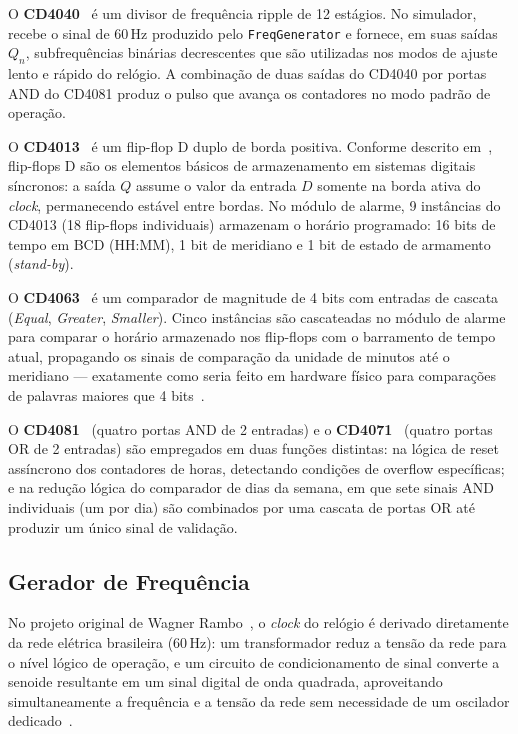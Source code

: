 \documentclass[12pt]{article}
\begin{document}
O \textbf{CD4040}~\cite{ti:cd4040} é um divisor de frequência ripple de 12 estágios. No simulador, recebe o sinal de 60\,Hz produzido pelo \texttt{FreqGenerator} e fornece, em suas saídas $Q_n$, subfrequências binárias decrescentes que são utilizadas nos modos de ajuste lento e rápido do relógio. A combinação de duas saídas do CD4040 por portas AND do CD4081 produz o pulso que avança os contadores no modo padrão de operação.

O \textbf{CD4013}~\cite{ti:cd4013} é um flip-flop D duplo de borda positiva. Conforme descrito em~\cite{floyd}, flip-flops D são os elementos básicos de armazenamento em sistemas digitais síncronos: a saída $Q$ assume o valor da entrada $D$ somente na borda ativa do \textit{clock}, permanecendo estável entre bordas. No módulo de alarme, 9 instâncias do CD4013 (18 flip-flops individuais) armazenam o horário programado: 16 bits de tempo em BCD (HH:MM), 1 bit de meridiano e 1 bit de estado de armamento (\textit{stand-by}).

O \textbf{CD4063}~\cite{ti:cd4063} é um comparador de magnitude de 4 bits com entradas de cascata (\textit{Equal}, \textit{Greater}, \textit{Smaller}). Cinco instâncias são cascateadas no módulo de alarme para comparar o horário armazenado nos flip-flops com o barramento de tempo atual, propagando os sinais de comparação da unidade de minutos até o meridiano — exatamente como seria feito em hardware físico para comparações de palavras maiores que 4 bits~\cite{tocci}.

O \textbf{CD4081}~\cite{ti:cd4081} (quatro portas AND de 2 entradas) e o \textbf{CD4071}~\cite{ti:cd4071} (quatro portas OR de 2 entradas) são empregados em duas funções distintas: na lógica de reset assíncrono dos contadores de horas, detectando condições de overflow específicas; e na redução lógica do comparador de dias da semana, em que sete sinais AND individuais (um por dia) são combinados por uma cascata de portas OR até produzir um único sinal de validação.

\subsection{Gerador de Frequência}

No projeto original de Wagner Rambo~\cite{rambo:15}, o \textit{clock} do relógio é derivado diretamente da rede elétrica brasileira (60\,Hz): um transformador reduz a tensão da rede para o nível lógico de operação, e um circuito de condicionamento de sinal converte a senoide resultante em um sinal digital de onda quadrada, aproveitando simultaneamente a frequência e a tensão da rede sem necessidade de um oscilador dedicado~\cite{mamede}.
\end{document}
